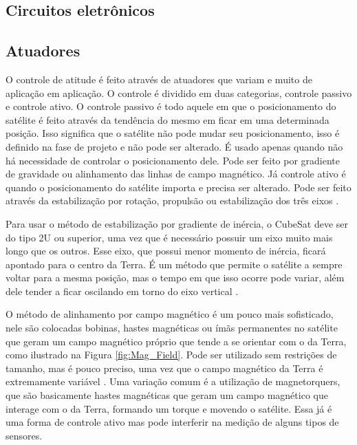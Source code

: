 \documentclass[
	12pt,				%
	openany,			%
	twoside,			%
	a4paper,			%
	english,			%
	french,				%
	spanish,			%
	brazil,				%
	oldfontcommands
	]{abntex2}
\begin{document}
\subsection{Circuitos eletrônicos}

\subsection{Atuadores}

O controle de atitude é feito através de atuadores que variam e muito de aplicação em aplicação. O controle é dividido em duas categorias, controle passivo e controle ativo. O controle passivo é todo aquele em que o posicionamento do satélite é feito através da tendência do mesmo em ficar em uma determinada posição. Isso significa que o satélite não pode mudar seu posicionamento, isso é definido na fase de projeto e não pode ser alterado. É usado apenas quando não há necessidade de controlar o posicionamento dele. Pode ser feito por gradiente de gravidade ou alinhamento das linhas de campo magnético. Já controle ativo é quando o posicionamento do satélite importa e precisa ser alterado. Pode ser feito através da estabilização por rotação, propulsão ou estabilização dos três eixos \cite{FrancLav}.

Para usar o método de estabilização por gradiente de inércia, o CubeSat deve ser do tipo 2U ou superior, uma vez que é necessário possuir um eixo muito mais longo que os outros. Esse eixo, que possui menor momento de inércia, ficará apontado para o centro da Terra. É um método que permite o satélite a sempre voltar para a mesma posição, mas o tempo em que isso ocorre pode variar, além dele tender a ficar oscilando em torno do eixo vertical \cite{FrancLav}.

O método de alinhamento por campo magnético é um pouco mais sofisticado, nele são colocadas bobinas, hastes magnéticas ou ímãs permanentes no satélite que geram um campo magnético próprio que tende a se orientar com o da Terra, como ilustrado na Figura \ref{fig:Mag_Field}. Pode ser utilizado sem restrições de tamanho, mas é pouco preciso, uma vez que o campo magnético da Terra é extremamente variável \cite{FrancLav}. Uma variação comum é a utilização de magnetorquers, que são basicamente hastes magnéticas que geram um campo magnético que interage com o da Terra, formando um torque e movendo o satélite. Essa já é uma forma de controle ativo mas pode interferir na medição de alguns tipos de sensores.
\end{document}
